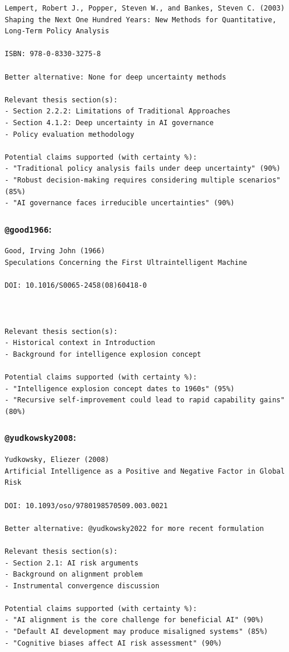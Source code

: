 \documentclass[
  11pt,
  letterpaper,
]{book}
\begin{document}
\begin{verbatim}
Lempert, Robert J., Popper, Steven W., and Bankes, Steven C. (2003)
Shaping the Next One Hundred Years: New Methods for Quantitative, Long-Term Policy Analysis

ISBN: 978-0-8330-3275-8

Better alternative: None for deep uncertainty methods

Relevant thesis section(s):
- Section 2.2.2: Limitations of Traditional Approaches
- Section 4.1.2: Deep uncertainty in AI governance
- Policy evaluation methodology

Potential claims supported (with certainty %):
- "Traditional policy analysis fails under deep uncertainty" (90%)
- "Robust decision-making requires considering multiple scenarios" (85%)
- "AI governance faces irreducible uncertainties" (90%)
\end{verbatim}

\subsubsection{\texorpdfstring{\texttt{@good1966}:
\textcite{good1966}}{@good1966: @good1966}}\label{good1966-good1966-1}

\begin{verbatim}
Good, Irving John (1966)
Speculations Concerning the First Ultraintelligent Machine

DOI: 10.1016/S0065-2458(08)60418-0



Relevant thesis section(s):
- Historical context in Introduction
- Background for intelligence explosion concept

Potential claims supported (with certainty %):
- "Intelligence explosion concept dates to 1960s" (95%)
- "Recursive self-improvement could lead to rapid capability gains" (80%)
\end{verbatim}

\subsubsection{\texorpdfstring{\texttt{@yudkowsky2008}:
\textcite{yudkowsky2008}}{@yudkowsky2008: @yudkowsky2008}}\label{yudkowsky2008-yudkowsky2008-1}

\begin{verbatim}
Yudkowsky, Eliezer (2008)
Artificial Intelligence as a Positive and Negative Factor in Global Risk

DOI: 10.1093/oso/9780198570509.003.0021

Better alternative: @yudkowsky2022 for more recent formulation

Relevant thesis section(s):
- Section 2.1: AI risk arguments
- Background on alignment problem
- Instrumental convergence discussion

Potential claims supported (with certainty %):
- "AI alignment is the core challenge for beneficial AI" (90%)
- "Default AI development may produce misaligned systems" (85%)
- "Cognitive biases affect AI risk assessment" (90%)
\end{verbatim}
\end{document}
